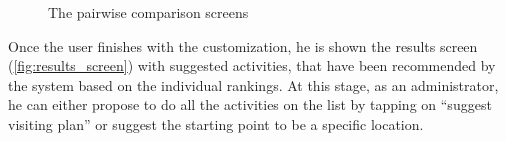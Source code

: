 \documentclass[11pt,a4paper,oneside]{article}
\begin{document}
\begin{figure}[H]
    \centering
    \qquad
    \qquad
    \caption{The pairwise comparison screens }%
    \label{fig:info_screens}%
\end{figure}

Once the user finishes with the customization, he is shown the results screen (\autoref{fig:results_screen}) with suggested activities, that have been recommended by the system based on the individual rankings. At this stage, as an administrator, he can either propose to do all the activities on the list by tapping on “suggest visiting plan” or suggest the starting point to be a specific location. 
\end{document}
